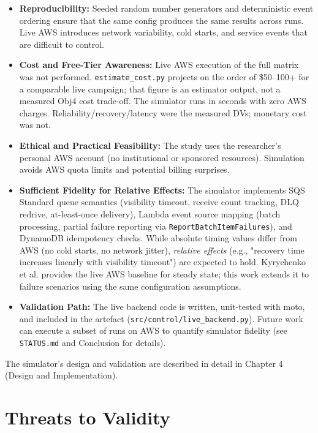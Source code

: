 \begin{itemize}
    \item \textbf{Reproducibility:} Seeded random number generators and deterministic event ordering ensure that the same config produces the same results across runs. Live AWS introduces network variability, cold starts, and service events that are difficult to control.
    
    \item \textbf{Cost and Free-Tier Awareness:} Live AWS execution of the full matrix was not performed. \texttt{estimate\_cost.py} projects on the order of \$50--100+ for a comparable live campaign; that figure is an estimator output, not a measured Obj4 cost trade-off. The simulator runs in seconds with zero AWS charges. Reliability/recovery/latency were the measured DVs; monetary cost was not.
    
    \item \textbf{Ethical and Practical Feasibility:} The study uses the researcher's personal AWS account (no institutional or sponsored resources). Simulation avoids AWS quota limits and potential billing surprises.
    
    \item \textbf{Sufficient Fidelity for Relative Effects:} The simulator implements SQS Standard queue semantics (visibility timeout, receive count tracking, DLQ redrive, at-least-once delivery), Lambda event source mapping (batch processing, partial failure reporting via \texttt{ReportBatchItemFailures}), and DynamoDB idempotency checks. While absolute timing values differ from AWS (no cold starts, no network jitter), \emph{relative effects} (e.g., "recovery time increases linearly with visibility timeout") are expected to hold. Kyrychenko et al. provides the live AWS baseline for steady state; this work extends it to failure scenarios using the same configuration assumptions.
    
    \item \textbf{Validation Path:} The live backend code is written, unit-tested with moto, and included in the artefact (\texttt{src/control/live\_backend.py}). Future work can execute a subset of runs on AWS to quantify simulator fidelity (see \texttt{STATUS.md} and Conclusion for details).
\end{itemize}

The simulator's design and validation are described in detail in Chapter 4 (Design and Implementation).

\section{Threats to Validity}

